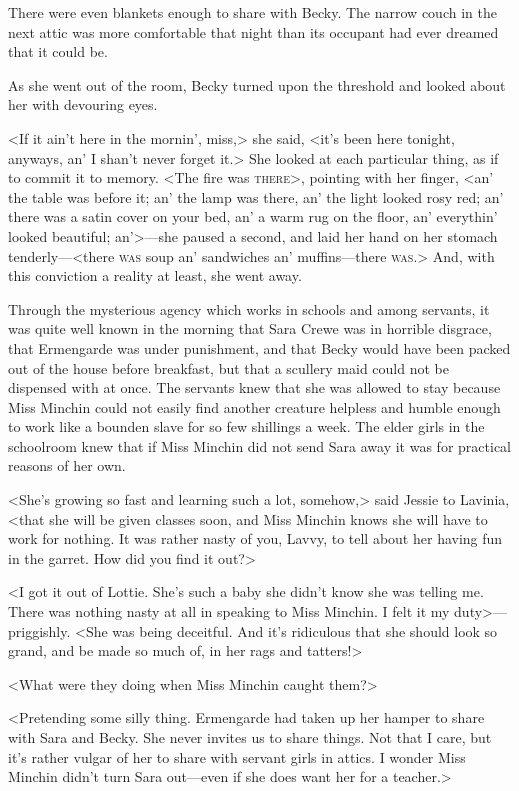 There were even blankets enough to share with Becky. The narrow couch in the next attic was more comfortable that night than its occupant had ever dreamed that it could be.

As she went out of the room, Becky turned upon the threshold and looked about her with devouring eyes.

<If it ain't here in the mornin', miss,> she said, <it's been here tonight, anyways, an' I shan't never forget it.> She looked at each particular thing, as if to commit it to memory. <The fire was \textsc{there}>, pointing with her finger, <an' the table was before it; an' the lamp was there, an' the light looked rosy red; an' there was a satin cover on your bed, an' a warm rug on the floor, an' everythin' looked beautiful; an'>—she paused a second, and laid her hand on her stomach tenderly—<there \textsc{was} soup an' sandwiches an' muffins—there \textsc{was}.> And, with this conviction a reality at least, she went away.

Through the mysterious agency which works in schools and among servants, it was quite well known in the morning that Sara Crewe was in horrible disgrace, that Ermengarde was under punishment, and that Becky would have been packed out of the house before breakfast, but that a scullery maid could not be dispensed with at once. The servants knew that she was allowed to stay because Miss Minchin could not easily find another creature helpless and humble enough to work like a bounden slave for so few shillings a week. The elder girls in the schoolroom knew that if Miss Minchin did not send Sara away it was for practical reasons of her own.

<She's growing so fast and learning such a lot, somehow,> said Jessie to Lavinia, <that she will be given classes soon, and Miss Minchin knows she will have to work for nothing. It was rather nasty of you, Lavvy, to tell about her having fun in the garret. How did you find it out?>

<I got it out of Lottie. She's such a baby she didn't know she was telling me. There was nothing nasty at all in speaking to Miss Minchin. I felt it my duty>—priggishly. <She was being deceitful. And it's ridiculous that she should look so grand, and be made so much of, in her rags and tatters!>

<What were they doing when Miss Minchin caught them?>

<Pretending some silly thing. Ermengarde had taken up her hamper to share with Sara and Becky. She never invites us to share things. Not that I care, but it's rather vulgar of her to share with servant girls in attics. I wonder Miss Minchin didn't turn Sara out—even if she does want her for a teacher.>

